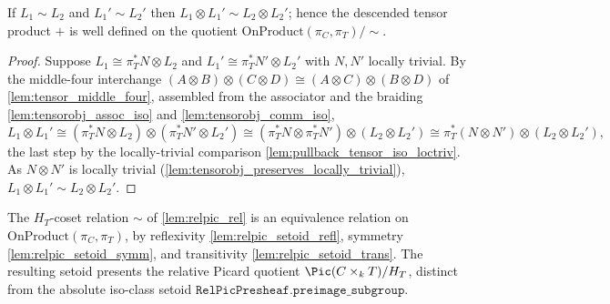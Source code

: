 \begin{lemma}\leanok
  \label{lem:relpic_add_welldef}
  If \(L_1 \sim L_2\) and \(L_1' \sim L_2'\) then
  \(L_1 \otimes L_1' \sim L_2 \otimes L_2'\); hence the descended tensor product
  \(+\) is well defined on the quotient
  \(\mathrm{OnProduct}(\pi_C, \pi_T) / {\sim}\).
\end{lemma}

\begin{proof}
  Suppose \(L_1 \cong \pi_T^* N \otimes L_2\) and
  \(L_1' \cong \pi_T^* N' \otimes L_2'\) with \(N, N'\) locally trivial. By the
  middle-four interchange
  \((A \otimes B) \otimes (C \otimes D) \cong (A \otimes C) \otimes (B \otimes D)\)
  of \cref{lem:tensor_middle_four}, assembled from the associator and the
  braiding \cref{lem:tensorobj_assoc_iso} and \cref{lem:tensorobj_comm_iso},
  \[
    L_1 \otimes L_1'
      \cong (\pi_T^* N \otimes L_2) \otimes (\pi_T^* N' \otimes L_2')
      \cong (\pi_T^* N \otimes \pi_T^* N') \otimes (L_2 \otimes L_2')
      \cong \pi_T^*(N \otimes N') \otimes (L_2 \otimes L_2') ,
  \]
  the last step by the locally-trivial comparison
  \cref{lem:pullback_tensor_iso_loctriv}. As \(N \otimes N'\) is locally
  trivial (\cref{lem:tensorobj_preserves_locally_trivial}),
  \(L_1 \otimes L_1' \sim L_2 \otimes L_2'\).
\leanok
\end{proof}

\begin{definition}\leanok
  \label{lem:relpic_setoid}
  The \(H_T\)-coset relation \(\sim\) of \cref{lem:relpic_rel} is an equivalence
  relation on \(\mathrm{OnProduct}(\pi_C, \pi_T)\), by reflexivity
  \cref{lem:relpic_setoid_refl}, symmetry \cref{lem:relpic_setoid_symm}, and
  transitivity \cref{lem:relpic_setoid_trans}. The resulting setoid presents the
  relative Picard quotient \(\Pic(C \times_k T) / H_T\), distinct from the
  absolute iso-class setoid \(\mathtt{RelPicPresheaf.preimage\_subgroup}\).
\end{definition}

